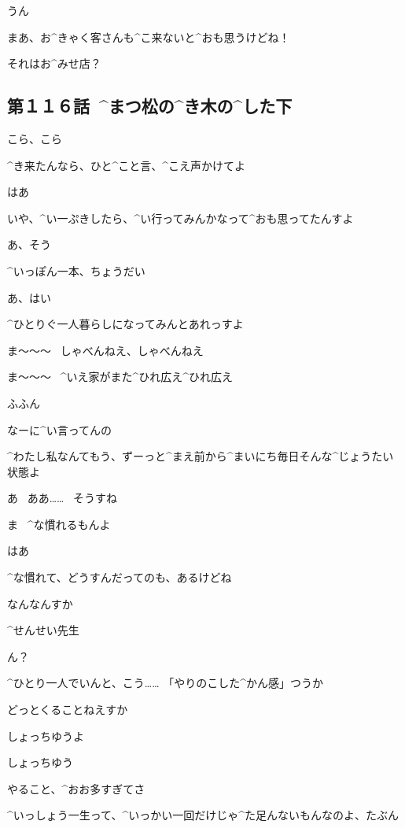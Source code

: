 \Makki うん

\page[76]
\Alpha まあ、お^{きゃく}{客}さんも^{こ}{来}ないと^{おも}{思}うけどね！

\Makki それはお^{みせ}{店}？


\subsection{第１１６話\ ^{まつ}{松}の^{き}{木}の^{した}{下}}

\page[79]
\Alpha こら、こら

\page[80]
\Sensei ^{き}{来}たんなら、ひと^{こと}{言}、^{こえ}{声}かけてよ

\Ojisan はあ

\Ojisan いや、^{い}{一}ぷきしたら、^{い}{行}ってみんかなって^{おも}{思}ってたんすよ

\Sensei あ、そう

\Sensei ^{いっぽん}{一本}、ちょうだい

\Ojisan あ、はい

\page[81]
\Ojisan ^{ひとりぐ}{一人暮}らしになってみんとあれっすよ

\Ojisan ま〜〜〜
\ しゃべんねえ、しゃべんねえ

\page[82]
\Ojisan ま〜〜〜
\ ^{いえ}{家}がまた^{ひれ}{広}え^{ひれ}{広}え

\Sensei ふふん

\Sensei なーに^{い}{言}ってんの

\Sensei ^{わたし}{私}なんてもう、ずーっと^{まえ}{前}から^{まいにち}{毎日}そんな^{じょうたい}{状態}よ

\Ojisan あ
\ ああ……
\ そうすね

\page[83]
\Sensei ま
\ ^{な}{慣}れるもんよ

\Ojisan はあ

\Sensei ^{な}{慣}れて、どうすんだってのも、あるけどね

\Ojisan なんなんすか

\page[85]
\Ojisan ^{せんせい}{先生}

\Sensei ん？

\Ojisan ^{ひとり}{一人}でいんと、こう……
「やりのこした^{かん}{感}」つうか

\Ojisan どっとくることねえすか

\Sensei しょっちゆうよ

\Ojisan しょっちゆう

\page[86]
\Sensei やること、^{おお}{多}すぎてさ

\Sensei ^{いっしょう}{一生}って、^{いっかい}{一回}だけじゃ^{た}{足}んないもんなのよ、たぶん

